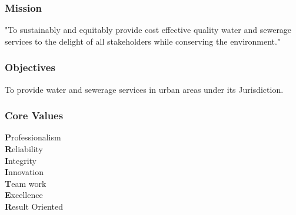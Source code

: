 \documentclass{article}
\begin{document}
\subsubsection{Mission}
"To sustainably and equitably provide cost effective quality water and sewerage services to the delight of all stakeholders while conserving the environment."
\subsubsection{Objectives}
To provide water and sewerage services in urban areas under its Jurisdiction.
\subsubsection{Core Values}
\textbf{P}rofessionalism\\ 
\textbf{R}eliability\\
\textbf{I}ntegrity\\
\textbf{I}nnovation\\
\textbf{T}eam work\\
\textbf{E}xcellence\\
\textbf{R}esult Oriented\\
\end{document}
